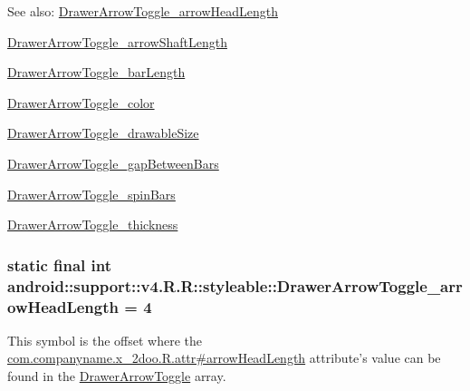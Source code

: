 \begin{Desc}
\item[See also:]\hyperlink{classandroid_1_1support_1_1v4_1_1_r_1_1styleable_1ae0d3d719748ee9ce810c7e3db7ab26}{DrawerArrowToggle\_\-arrowHeadLength} 

\hyperlink{classandroid_1_1support_1_1v4_1_1_r_1_1styleable_019721c1dd6ebdd0cf7066eefbb929f5}{DrawerArrowToggle\_\-arrowShaftLength} 

\hyperlink{classandroid_1_1support_1_1v4_1_1_r_1_1styleable_0e89f15d919cd6100bf02a0769720644}{DrawerArrowToggle\_\-barLength} 

\hyperlink{classandroid_1_1support_1_1v4_1_1_r_1_1styleable_a1f61b1d9facd68b52706ef636cd8da9}{DrawerArrowToggle\_\-color} 

\hyperlink{classandroid_1_1support_1_1v4_1_1_r_1_1styleable_307f755b60bc3d3a3914d600013df9db}{DrawerArrowToggle\_\-drawableSize} 

\hyperlink{classandroid_1_1support_1_1v4_1_1_r_1_1styleable_d16bea2da35eaa358153b1dbdb3bf075}{DrawerArrowToggle\_\-gapBetweenBars} 

\hyperlink{classandroid_1_1support_1_1v4_1_1_r_1_1styleable_eddc59e474629cd8f55d74fd27cb0b1f}{DrawerArrowToggle\_\-spinBars} 

\hyperlink{classandroid_1_1support_1_1v4_1_1_r_1_1styleable_fb89c8d4e0500b91043fa694395850ec}{DrawerArrowToggle\_\-thickness} \end{Desc}
\hypertarget{classandroid_1_1support_1_1v4_1_1_r_1_1styleable_1ae0d3d719748ee9ce810c7e3db7ab26}{
\subsubsection[{DrawerArrowToggle\_\-arrowHeadLength}]{\setlength{\rightskip}{0pt plus 5cm}static final int android::support::v4.R.R::styleable::DrawerArrowToggle\_\-arrowHeadLength = 4}}
\label{classandroid_1_1support_1_1v4_1_1_r_1_1styleable_1ae0d3d719748ee9ce810c7e3db7ab26}


This symbol is the offset where the \hyperlink{classcom_1_1companyname_1_1x__2doo_1_1_r_1_1attr_a124af75ac2b3ab12d263ba36870a259}{com.companyname.x\_\-2doo.R.attr\#arrowHeadLength} attribute's value can be found in the \hyperlink{classandroid_1_1support_1_1v4_1_1_r_1_1styleable_df2952a999161d3c408fb6267800afe6}{DrawerArrowToggle} array.

